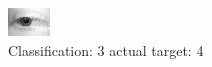 \begin{figure}[h!]
\begin{center}
\includegraphics[width=0.60\columnwidth]{figures/ID2674_class_3_target_4.png}
\end{center}
\caption{ Classification: 3 actual target: 4}
\label{fig:ID2674_class_3_target_4}
\end{figure}
